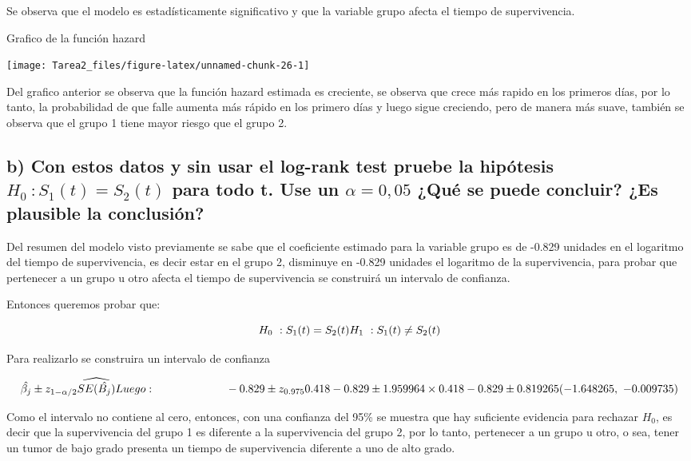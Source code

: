 \documentclass[
]{article}
\begin{document}
Se observa que el modelo es estadísticamente significativo y que la
variable grupo afecta el tiempo de supervivencia.

Grafico de la función hazard

\begin{center}\texttt{[image: Tarea2\_files/figure-latex/unnamed-chunk-26-1]} \end{center}

Del grafico anterior se observa que la función hazard estimada es
creciente, se observa que crece más rapido en los primeros días, por lo
tanto, la probabilidad de que falle aumenta más rápido en los primero
días y luego sigue creciendo, pero de manera más suave, también se
observa que el grupo 1 tiene mayor riesgo que el grupo 2.

\subsection{b) Con estos datos y sin usar el log-rank test pruebe la hipótesis $H_0~:S_1(t) = S_2(t)$ para todo t. Use un $\alpha = 0,05$ ¿Qué se puede concluir? ¿Es plausible la conclusión?}

Del resumen del modelo visto previamente se sabe que el coeficiente
estimado para la variable grupo es de -0.829 unidades en el logaritmo
del tiempo de supervivencia, es decir estar en el grupo 2, disminuye en
-0.829 unidades el logaritmo de la supervivencia, para probar que
pertenecer a un grupo u otro afecta el tiempo de supervivencia se
construirá un intervalo de confianza.

Entonces queremos probar que:

\[H_0~:S_1(t) = S_2(t) \\ H_1~:S_1(t) \neq S_2(t)\]

Para realizarlo se construira un intervalo de confianza

\[\hat{\beta_j} \pm z_{1 - \alpha/2} \widehat{SE(\hat{B_j})} \\ 
Luego: ~~~~~~~~~~~~~~~~~~~~ \\
-0.829 \pm z_{0.975}0.418 \\
-0.829 \pm 1.959964\times0.418 \\ 
-0.829 \pm 0.819265 \\
(-1.648265,~-0.009735)\]

Como el intervalo no contiene al cero, entonces, con una confianza del
95\% se muestra que hay suficiente evidencia para rechazar \(H_0\), es
decir que la supervivencia del grupo 1 es diferente a la supervivencia
del grupo 2, por lo tanto, pertenecer a un grupo u otro, o sea, tener un
tumor de bajo grado presenta un tiempo de supervivencia diferente a uno
de alto grado.
\end{document}
